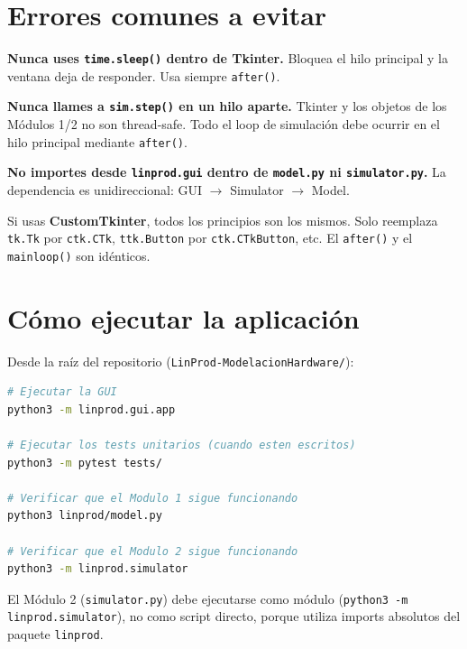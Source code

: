 \documentclass[12pt,letterpaper]{article}
\begin{document}
\section{Errores comunes a evitar}

\begin{advertencia}
\textbf{Nunca uses \texttt{time.sleep()} dentro de Tkinter.} Bloquea el hilo
principal y la ventana deja de responder. Usa siempre \texttt{after()}.
\end{advertencia}

\begin{advertencia}
\textbf{Nunca llames a \texttt{sim.step()} en un hilo aparte.} Tkinter y los
objetos de los Módulos 1/2 no son thread-safe. Todo el loop de simulación debe
ocurrir en el hilo principal mediante \texttt{after()}.
\end{advertencia}

\begin{advertencia}
\textbf{No importes desde \texttt{linprod.gui} dentro de \texttt{model.py} ni
\texttt{simulator.py}.} La dependencia es unidireccional: GUI $\rightarrow$
Simulator $\rightarrow$ Model.
\end{advertencia}

\begin{info}
Si usas \textbf{CustomTkinter}, todos los principios son los mismos. Solo
reemplaza \texttt{tk.Tk} por \texttt{ctk.CTk}, \texttt{ttk.Button} por
\texttt{ctk.CTkButton}, etc. El \texttt{after()} y el \texttt{mainloop()} son
idénticos.
\end{info}

\section{Cómo ejecutar la aplicación}

Desde la raíz del repositorio (\texttt{LinProd-ModelacionHardware/}):

\begin{lstlisting}[language=bash, numbers=none]
# Ejecutar la GUI
python3 -m linprod.gui.app

# Ejecutar los tests unitarios (cuando esten escritos)
python3 -m pytest tests/

# Verificar que el Modulo 1 sigue funcionando
python3 linprod/model.py

# Verificar que el Modulo 2 sigue funcionando
python3 -m linprod.simulator
\end{lstlisting}

\begin{info}
El Módulo 2 (\texttt{simulator.py}) debe ejecutarse como módulo
(\texttt{python3 -m linprod.simulator}), no como script directo, porque
utiliza imports absolutos del paquete \texttt{linprod}.
\end{info}
\end{document}
